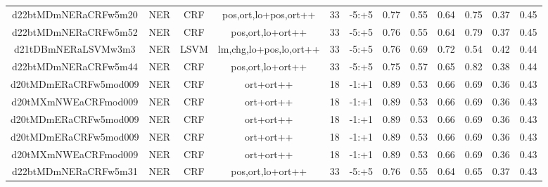 \documentclass[a4paper]{article}
\begin{document}
\begin{landscape}
\begin{center}
\begin{tabular}{ |c|c|c|c|c|c|c|c|c|c|c|c|}
 
 	
 	\small{ d22btMDmNERaCRFw5m20 } & \small{ NER} & \small{  CRF }  & pos,ort,lo+pos,ort++  &  33 &  \small{  -5:+5 }  &  0.77 & 0.55 & 0.64  &  0.75 & 0.37 & 0.45 \\
 	

 
 	
 	\small{ d22btMDmNERaCRFw5m52 } & \small{ NER} & \small{  CRF }  & pos,ort,lo+ort++  &  33 &  \small{  -5:+5 }  &  0.76 & 0.55 & 0.64  &  0.79 & 0.37 & 0.45 \\
 	

 
 	
 	\small{ d21tDBmNERaLSVMw3m3 } & \small{ NER} & \small{  LSVM }  & lm,chg,lo+pos,lo,ort++  &  33 &  \small{  -5:+5 }  &  0.76 & 0.69 & 0.72  &  0.54 & 0.42 & 0.44 \\
 	

 
 	
 	\small{ d22btMDmNERaCRFw5m44 } & \small{ NER} & \small{  CRF }  & pos,ort,lo+ort++  &  33 &  \small{  -5:+5 }  &  0.75 & 0.57 & 0.65  &  0.82 & 0.38 & 0.44 \\
 	

 
 	
 	\small{ d20tMDmERaCRFw5mod009 } & \small{ NER} & \small{  CRF }  & ort+ort++  &  18 &  \small{  -1:+1 }  &  0.89 & 0.53 & 0.66  &  0.69 & 0.36 & 0.43 \\
 	

 
 	
 	\small{ d20tMXmNWEaCRFmod009 } & \small{ NER} & \small{  CRF }  & ort+ort++  &  18 &  \small{  -1:+1 }  &  0.89 & 0.53 & 0.66  &  0.69 & 0.36 & 0.43 \\
 	

 
 	
 	\small{ d20tMDmERaCRFw5mod009 } & \small{ NER} & \small{  CRF }  & ort+ort++  &  18 &  \small{  -1:+1 }  &  0.89 & 0.53 & 0.66  &  0.69 & 0.36 & 0.43 \\
 	

 
 	
 	\small{ d20tMDmERaCRFw5mod009 } & \small{ NER} & \small{  CRF }  & ort+ort++  &  18 &  \small{  -1:+1 }  &  0.89 & 0.53 & 0.66  &  0.69 & 0.36 & 0.43 \\
 	

 
 	
 	\small{ d20tMXmNWEaCRFmod009 } & \small{ NER} & \small{  CRF }  & ort+ort++  &  18 &  \small{  -1:+1 }  &  0.89 & 0.53 & 0.66  &  0.69 & 0.36 & 0.43 \\
 	

 
 	
 	\small{ d22btMDmNERaCRFw5m31 } & \small{ NER} & \small{  CRF }  & pos,ort,lo+ort++  &  33 &  \small{  -5:+5 }  &  0.76 & 0.55 & 0.64  &  0.65 & 0.37 & 0.43 \\
 	


\end{tabular}
\end{center}
\end{landscape}
\end{document}
